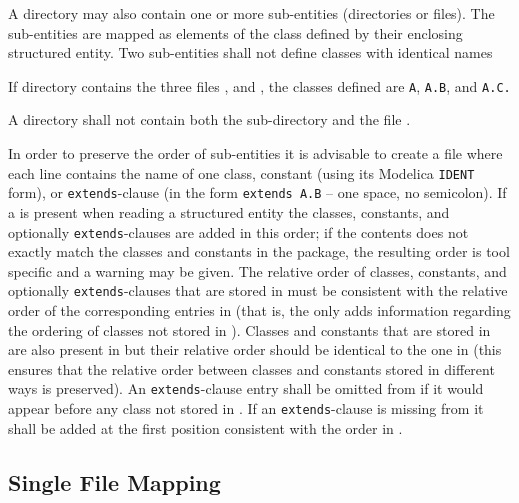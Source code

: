 A directory may also contain one or more sub-entities (directories or files).
The sub-entities are mapped as elements of the class defined by their enclosing structured entity.
Two sub-entities shall not define classes with identical names

\begin{example}
If directory  contains the three files ,  and , the classes defined are \lstinline!A!,
\lstinline!A.B!, and \lstinline!A.C.!
\end{example}

\begin{example}
A directory shall not contain both the sub-directory  and the file .
\end{example}

In order to preserve the order of sub-entities it is advisable to create a file  where each line contains the name of one class, constant (using its Modelica \lstinline!IDENT! form), or \lstinline!extends!-clause (in the form \lstinline!extends A.B! -- one space, no semicolon).
If a  is present when reading a structured entity the classes, constants, and optionally \lstinline!extends!-clauses are added in this order; if the contents does not exactly match the classes and constants in the package, the resulting order is tool specific and a warning may be given.
The relative order of classes, constants, and optionally \lstinline!extends!-clauses that are stored in  must be consistent with the relative order of the corresponding entries in  (that is, the  only adds information regarding the ordering of classes not stored in ).
Classes and constants that are stored in  are also present in  but their relative order should be identical to the one in  (this ensures that the relative order between classes and constants stored in different ways is preserved).
An \lstinline!extends!-clause entry shall be omitted from  if it would appear before any class not stored in .
If an \lstinline!extends!-clause is missing from  it shall be added at the first position consistent with the order in .


\subsection{Single File Mapping}\label{mapping-a-package-class-hierarchy-into-a-single-file-nonstructured-entity}\label{single-file-mapping}

